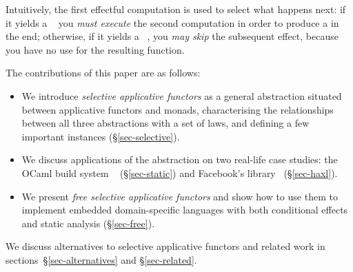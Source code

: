 \noindent
Intuitively, the first effectful computation is used to select what happens
next: if it yields a ~ you \emph{must execute} the second
computation in order to produce a  in the end; otherwise, if it yields a
~, you \emph{may skip} the subsequent effect, because you have
no use for the resulting function.

The contributions of this paper are as follows:

\vspace{-1mm}
\begin{itemize}
    \item We introduce \emph{selective applicative functors} as a general
    abstraction situated between applicative functors and monads, characterising
    the relationships between all three abstractions with a set of laws, and
    defining a few important instances (\S\ref{sec-selective}).
    \item We discuss applications of the abstraction on two real-life case
    studies: the OCaml build system \Dune~\citep{dune} (\S\ref{sec-static}) and
    Facebook's \Haxl library~\cite{marlow2014haxl} (\S\ref{sec-haxl}).
    \item We present \emph{free selective applicative functors} and show how to
    use them to implement embedded domain-specific languages with both
    conditional effects and static analysis (\S\ref{sec-free}).
\end{itemize}

We discuss alternatives to selective applicative functors and related work in
sections~\S\ref{sec-alternatives} and \S\ref{sec-related}.
